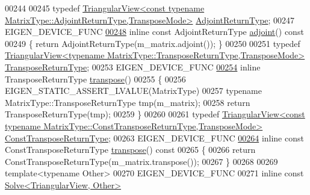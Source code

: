 \begin{DoxyCode}
00244 
00245     \textcolor{keyword}{typedef} 
      \hyperlink{group___core___module_class_eigen_1_1_triangular_view}{TriangularView<const typename MatrixType::AdjointReturnType,TransposeMode>}
       \hyperlink{group___core___module_class_eigen_1_1_triangular_view}{AdjointReturnType};
00247     EIGEN\_DEVICE\_FUNC
\hyperlink{group___core___module_ab36cd4a400b5a9944b87780ebd3bec43}{00248}     \textcolor{keyword}{inline} \textcolor{keyword}{const} AdjointReturnType \hyperlink{group___core___module_ab36cd4a400b5a9944b87780ebd3bec43}{adjoint}()\textcolor{keyword}{ const}
00249 \textcolor{keyword}{    }\{ \textcolor{keywordflow}{return} AdjointReturnType(m\_matrix.adjoint()); \}
00250 
00251     \textcolor{keyword}{typedef} 
      \hyperlink{group___core___module_class_eigen_1_1_triangular_view}{TriangularView<typename MatrixType::TransposeReturnType,TransposeMode>}
       \hyperlink{group___core___module_class_eigen_1_1_triangular_view}{TransposeReturnType};
00253     EIGEN\_DEVICE\_FUNC
\hyperlink{group___core___module_a5336b45208d7e351aba7536aef153075}{00254}     \textcolor{keyword}{inline} TransposeReturnType \hyperlink{group___core___module_a5336b45208d7e351aba7536aef153075}{transpose}()
00255     \{
00256       EIGEN\_STATIC\_ASSERT\_LVALUE(MatrixType)
00257       \textcolor{keyword}{typename} MatrixType::TransposeReturnType tmp(m\_matrix);
00258       \textcolor{keywordflow}{return} TransposeReturnType(tmp);
00259     \}
00260     
00261     \textcolor{keyword}{typedef} 
      \hyperlink{group___core___module_class_eigen_1_1_triangular_view}{TriangularView<const typename MatrixType::ConstTransposeReturnType,TransposeMode>}
       \hyperlink{group___core___module_class_eigen_1_1_triangular_view}{ConstTransposeReturnType};
00263     EIGEN\_DEVICE\_FUNC
\hyperlink{group___core___module_a202b574fc82f1433989c3ae35128451e}{00264}     \textcolor{keyword}{inline} \textcolor{keyword}{const} ConstTransposeReturnType \hyperlink{group___core___module_a202b574fc82f1433989c3ae35128451e}{transpose}()\textcolor{keyword}{ const}
00265 \textcolor{keyword}{    }\{
00266       \textcolor{keywordflow}{return} ConstTransposeReturnType(m\_matrix.transpose());
00267     \}
00268 
00269     \textcolor{keyword}{template}<\textcolor{keyword}{typename} Other>
00270     EIGEN\_DEVICE\_FUNC
00271     \textcolor{keyword}{inline} \textcolor{keyword}{const} \hyperlink{group___core___module_class_eigen_1_1_solve}{Solve<TriangularView, Other>} 

\end{DoxyCode}
